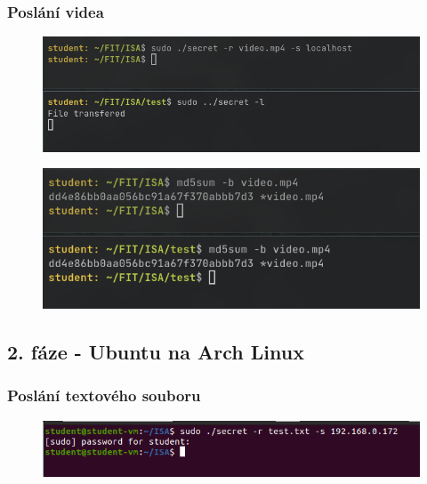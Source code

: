 \documentclass[11pt, a4paper]{article}
\begin{document}
\begin{flushleft}
\subsubsection{Poslání videa}

 \begin{figure}[H]
    \centering
    \includegraphics[scale=0.62, keepaspectratio]{img/send_vid.png}
    \label{fig:txt}
 \end{figure}
 
  \begin{figure}[H]
    \centering
    \includegraphics[scale=0.77, keepaspectratio]{img/cmp_vid.png}
    \label{fig:txt}
 \end{figure}


\subsection{2. fáze - Ubuntu na Arch Linux}

\subsubsection{Poslání textového souboru}
\begin{figure}[H]
    \centering
    \includegraphics[scale=0.7, keepaspectratio]{img/ub_send_txt1.png}
    \label{fig:txt}
 \end{figure}
 

\end{flushleft}
\end{document}
